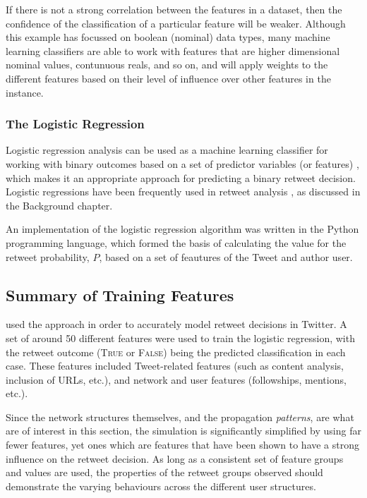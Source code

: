 If there is not a strong correlation between the features in a dataset, then the confidence of the classification of a particular feature will be weaker. Although this example has focussed on boolean (nominal) data types, many machine learning classifiers are able to work with features that are higher dimensional nominal values, contunuous reals, and so on, and will apply weights to the different features based on their level of influence over other features in the instance.


\subsubsection{The Logistic Regression}
Logistic regression analysis can be used as a machine learning classifier for working with binary outcomes based on a set of predictor variables (or features) \cite{hosmer13}, which makes it an appropriate approach for predicting a binary retweet decision. Logistic regressions have been frequently used in retweet analysis \cite{castillo11} \cite{zhu11} \cite{peng11} \cite{naveed11} \cite{hong11}, as discussed in the Background chapter.

An implementation of the logistic regression algorithm was written in the Python programming language, which formed the basis of calculating the value for the retweet probability, $P$, based on a set of feautures of the Tweet and author user.


\subsection{Summary of Training Features}
\cite{zhu11} used the approach in order to accurately model retweet decisions in Twitter. A set of around 50 different features were used to train the logistic regression, with the retweet outcome (\textsc{True} or \textsc{False}) being the predicted classification in each case. These features included Tweet-related features (such as content analysis, inclusion of URLs, etc.), and network and user features (followships, mentions, etc.).

Since the network structures themselves, and the propagation \textit{patterns}, are what are of interest in this section, the simulation is significantly simplified by using far fewer features, yet ones which are features that have been shown to have a strong influence on the retweet decision. As long as a consistent set of feature groups and values are used, the properties of the retweet groups observed should demonstrate the varying behaviours across the different user structures.

